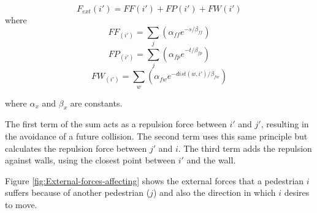 \documentclass[draftclsnofoot]{IEEEtran}
\begin{document}
\begin{itemize}
\begin{itemize}
    \[
        F_{ext}(i') = FF(i') + FP(i') + FW(i')
    \]
    where
    \[
        FF_(i') = \sum_{j}(\alpha_{ff}e^{-s/\beta_{ff}})
    \]
    \[
        FP_(i') = \sum_{j}(\alpha_{fp}e^{-t/\beta_{fp}})
    \]
    \[
        FW_(i') = \sum_{w}(\alpha_{fw}e^{-dist(w,i')/\beta_{fw}})
    \]

    where $\alpha_{x}$ and $\beta_{x}$ are constants.
    
    The first term of the sum acts as a repulsion force between $i'$ and
    $j'$, resulting in the avoidance of a future collision. The second
    term uses this same principle but calculates the repulsion force between
    $j'$ and $i$. The third term adds the repulsion against walls, using the
    closest point between $i'$ and the wall.
    

    Figure \ref{fig:External-forces-affecting} shows the external forces
    that a pedestrian $i$ suffers because of another pedestrian ($j$)
    and also the direction in which $i$ desires to move.


\end{itemize}
\end{itemize}
\end{document}
